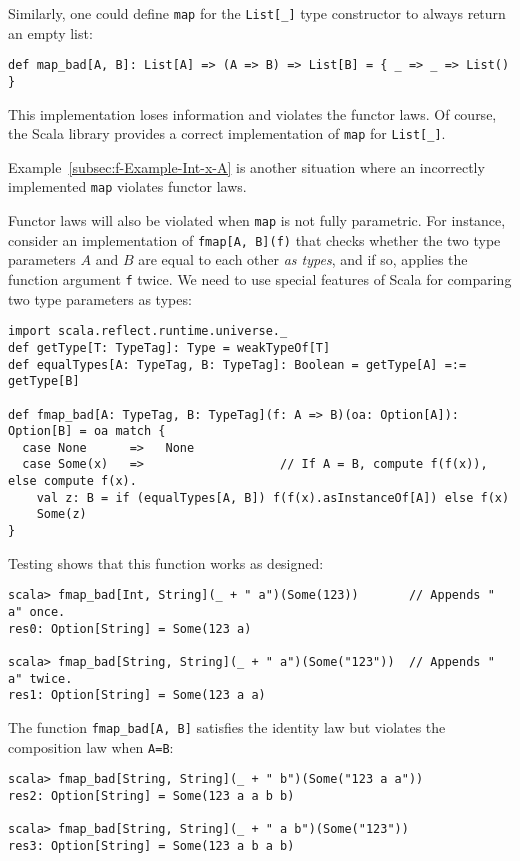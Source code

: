 Similarly, one could define \lstinline!map! for the \lstinline!List[_]!
type constructor to always return an empty list:
\begin{lstlisting}
def map_bad[A, B]: List[A] => (A => B) => List[B] = { _ => _ => List() }
\end{lstlisting}
This implementation loses information and violates the functor laws.
Of course, the Scala library provides a correct implementation of
\lstinline!map! for \lstinline!List[_]!.

Example~\ref{subsec:f-Example-Int-x-A} is another situation where
an incorrectly implemented \lstinline!map! violates functor laws.

Functor laws will also be violated when \lstinline!map! is not fully
parametric. For instance, consider an implementation of \lstinline!fmap[A, B](f)!
that checks whether the two type parameters $A$ and $B$ are equal
to each other \emph{as types}, and if so, applies the function argument
\lstinline!f! twice. We need to use special features of Scala for
comparing two type parameters as types:
\begin{lstlisting}
import scala.reflect.runtime.universe._
def getType[T: TypeTag]: Type = weakTypeOf[T]
def equalTypes[A: TypeTag, B: TypeTag]: Boolean = getType[A] =:= getType[B]

def fmap_bad[A: TypeTag, B: TypeTag](f: A => B)(oa: Option[A]): Option[B] = oa match {
  case None      =>   None
  case Some(x)   =>                   // If A = B, compute f(f(x)), else compute f(x).
    val z: B = if (equalTypes[A, B]) f(f(x).asInstanceOf[A]) else f(x)
    Some(z)
}
\end{lstlisting}
Testing shows that this function works as designed:
\begin{lstlisting}
scala> fmap_bad[Int, String](_ + " a")(Some(123))       // Appends " a" once.
res0: Option[String] = Some(123 a)

scala> fmap_bad[String, String](_ + " a")(Some("123"))  // Appends " a" twice.
res1: Option[String] = Some(123 a a)
\end{lstlisting}
The function \lstinline!fmap_bad[A, B]! satisfies the identity law
but violates the composition law when \lstinline!A=B!:
\begin{lstlisting}
scala> fmap_bad[String, String](_ + " b")(Some("123 a a"))
res2: Option[String] = Some(123 a a b b)

scala> fmap_bad[String, String](_ + " a b")(Some("123"))
res3: Option[String] = Some(123 a b a b)
\end{lstlisting}

